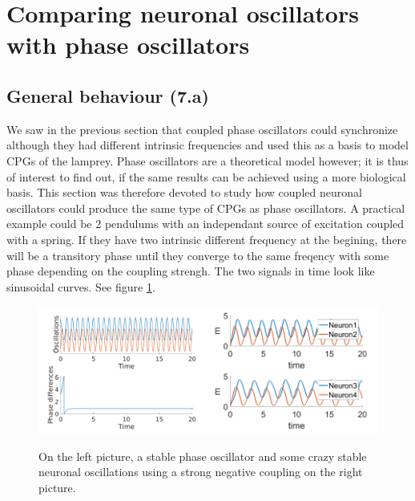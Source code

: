 \documentclass[a4paper]{scrartcl}
\begin{document}
\FloatBarrier

\section{Comparing neuronal oscillators with phase oscillators}
\subsection{General behaviour (7.a)}

We saw  in the previous section that coupled phase oscillators could synchronize although they had different intrinsic frequencies and used this as a basis to model CPGs of the lamprey. Phase oscillators are a theoretical model however; it is thus of interest to find out, if the same results can be achieved using a more biological basis. This section was therefore devoted to study how coupled neuronal oscillators could produce the same type of CPGs as phase oscillators. A practical example could be 2 pendulums with an independant source of excitation coupled with a spring. If they have two intrinsic different frequency at the begining, there will be a transitory phase until they converge to the same freqency with some phase depending on the coupling strengh. The two signals in time look like sinusoidal curves. See figure \ref{2phase}.

\begin{figure}[!h]
	\centering
	\includegraphics[width=0.5\textwidth]{fig/2phase.png}\includegraphics[width=0.5\textwidth]{fig/neuron1}
	\caption{On the left picture, a stable phase oscillator and some crazy stable neuronal oscillations using a strong negative coupling on the right picture.}\label{2phase}
\end{figure}
\end{document}
